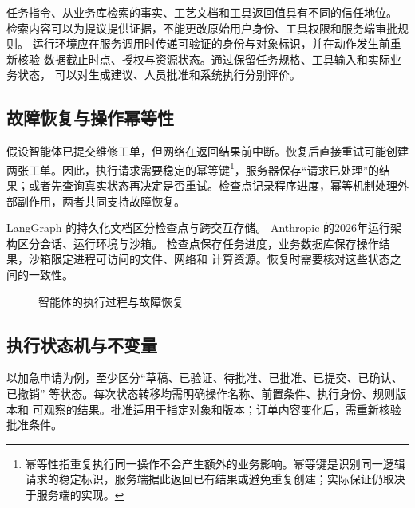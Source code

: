 任务指令、从业务库检索的事实、工艺文档和工具返回值具有不同的信任地位。
检索内容可以为提议提供证据，不能更改原始用户身份、工具权限和服务端审批规则。
运行环境应在服务调用时传递可验证的身份与对象标识，并在动作发生前重新核验
数据截止时点、授权与资源状态。通过保留任务规格、工具输入和实际业务状态，
可以对生成建议、人员批准和系统执行分别评价。

\subsection{故障恢复与操作幂等性}
\label{sec:execution-recovery}
假设智能体已提交维修工单，但网络在返回结果前中断。恢复后直接重试可能创建两张工单。因此，执行请求需要稳定的幂等键\footnote{幂等性指重复执行同一操作不会产生额外的业务影响。幂等键是识别同一逻辑请求的稳定标识，服务端据此返回已有结果或避免重复创建；实际保证仍取决于服务端的实现。}，服务器保存“请求已处理”的结果；或者先查询真实状态再决定是否重试。检查点记录程序进度，幂等机制处理外部副作用，两者共同支持故障恢复。

LangGraph 的持久化文档区分检查点与跨交互存储\cite{langgraph10}。
Anthropic 的2026年运行架构区分会话、运行环境与沙箱\cite{managed10}。
检查点保存任务进度，业务数据库保存操作结果，沙箱限定进程可访问的文件、网络和
计算资源。恢复时需要核对这些状态之间的一致性。

\begin{figure}[htbp]
\centering
{}
\caption{智能体的执行过程与故障恢复}
\end{figure}

\subsection{执行状态机与不变量}
以加急申请为例，至少区分“草稿、已验证、待批准、已批准、已提交、已确认、已撤销”
等状态。每次状态转移均需明确操作名称、前置条件、执行身份、规则版本和
可观察的结果。批准适用于指定对象和版本；订单内容变化后，需重新核验批准条件。

